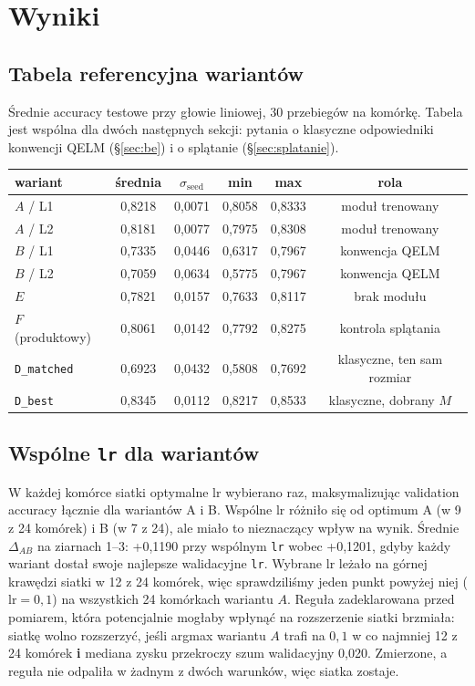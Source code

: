 \documentclass[11pt, a4paper]{article}
\begin{document}
\section{Wyniki}

\subsection{Tabela referencyjna wariantów}\label{sec:ramiona}

Średnie accuracy testowe przy głowie liniowej, 30 przebiegów na komórkę. Tabela jest wspólna dla dwóch następnych sekcji: pytania o klasyczne odpowiedniki konwencji QELM (\S\ref{sec:be}) i o splątanie (\S\ref{sec:splatanie}).

\begin{table}[H]
\centering
\renewcommand{\arraystretch}{1.3}
\begin{tabular}{lccccc}
\toprule
\textbf{wariant} & \textbf{średnia} & $\sigma_{\text{seed}}$ & \textbf{min} & \textbf{max} & \textbf{rola} \\
\midrule
$A$ / L1 & 0,8218 & 0,0071 & 0,8058 & 0,8333 & moduł trenowany \\
$A$ / L2 & 0,8181 & 0,0077 & 0,7975 & 0,8308 & moduł trenowany \\
$B$ / L1 & 0,7335 & 0,0446 & 0,6317 & 0,7967 & konwencja QELM \\
$B$ / L2 & 0,7059 & 0,0634 & 0,5775 & 0,7967 & konwencja QELM \\
$E$ & 0,7821 & 0,0157 & 0,7633 & 0,8117 & brak modułu \\
$F$ (produktowy) & 0,8061 & 0,0142 & 0,7792 & 0,8275 & kontrola splątania \\
\texttt{D\_matched} & 0,6923 & 0,0432 & 0,5808 & 0,7692 & klasyczne, ten sam rozmiar \\
\texttt{D\_best} & 0,8345 & 0,0112 & 0,8217 & 0,8533 & klasyczne, dobrany $M$ \\
\bottomrule
\end{tabular}

\end{table}

\subsection{Wspólne \texttt{lr} dla wariantów}

W każdej komórce siatki optymalne lr wybierano raz, maksymalizując validation accuracy łącznie dla wariantów A i B. Wspólne lr różniło się od optimum A (w 9 z 24 komórek) i B (w 7 z 24), ale miało to  nieznaczący wpływ na wynik. Średnie $\Delta_{AB}$ na ziarnach 1--3: +0,1190 przy wspólnym \texttt{lr} wobec +0,1201, gdyby każdy wariant dostał swoje najlepsze walidacyjne \texttt{lr}. Wybrane $\mathrm{lr}$ leżało na górnej krawędzi siatki w 12 z 24 komórek, więc sprawdziliśmy jeden punkt powyżej niej ($\mathrm{lr} = 0{,}1$) na wszystkich 24 komórkach wariantu $A$. Reguła zadeklarowana przed pomiarem, która potencjalnie mogłaby wpłynąć na rozszerzenie siatki brzmiała: siatkę wolno rozszerzyć, jeśli argmax wariantu $A$ trafi na $0{,}1$ w co najmniej 12 z 24 komórek \textbf{i} mediana zysku przekroczy szum walidacyjny 0,020. Zmierzone, a reguła nie odpaliła w żadnym z dwóch warunków, więc siatka zostaje.
\end{document}
